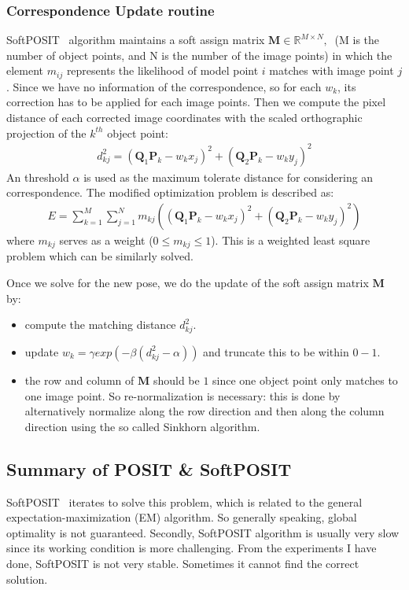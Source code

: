\documentclass[a4paper]{article}
\begin{document}
\subsubsection{Correspondence Update routine}
SoftPOSIT~\cite{softposit} algorithm maintains a soft assign matrix $\mathbf{M} \in \mathbb{R}^{M\times N},\ $ (M is the number of object points, and N is the number of the image points) in which the element $m_{ij}$ represents the likelihood of model point $i$ matches with image point $j$. Since we have no information of the correspondence, so for each $w_k$, its correction has to be applied for each image points. Then we compute the pixel distance of each corrected image coordinates with the scaled orthographic projection of the $k^{th}$ object point:
\begin{align*}
d_{kj}^2=(\mathbf{Q}_1\mathbf{P}_k-w_k x_j)^2 + (\mathbf{Q}_2\mathbf{P}_k-w_k y_j)^2
\end{align*}
An threshold $\alpha$ is used as the maximum tolerate distance for considering an correspondence. The modified optimization problem is described as:
\begin{align*}
E=\sum_{k=1}^{M}\sum_{j=1}^{N}m_{kj}\left(
\left(
\mathbf{Q}_1\mathbf{P}_k-w_k x_j
\right)^2+
\left(
\mathbf{Q}_2\mathbf{P}_k-w_k y_j
\right)^2
\right)
\end{align*}
where $m_{kj}$ serves as a weight ($0 \leq m_{kj} \leq 1$). This is a weighted least square problem which can be similarly solved. 

Once we solve for the new pose, we do the update of the soft assign matrix $\mathbf{M}$ by:
\begin{itemize}
	\item compute the matching distance $d_{kj}^2$.
	\item update $w_k=\gamma exp(-\beta(d_{kj}^2-\alpha))$ and truncate this to be within $0-1$.
	\item the row and column of $\mathbf{M}$ should be $1$ since one object point only matches to one image point. So re-normalization is necessary: this is done by alternatively normalize along the row direction and then along the column direction using the so called Sinkhorn algorithm.
\end{itemize}

\subsection{Summary of POSIT \& SoftPOSIT}
SoftPOSIT~\cite{softposit} iterates to solve this problem, which is related to the general expectation-maximization (EM) algorithm. So generally speaking, global optimality is not guaranteed. Secondly, SoftPOSIT algorithm is usually very slow since its working condition is more challenging. From the experiments I have done, SoftPOSIT is not very stable. Sometimes it cannot find the correct solution.
\end{document}
